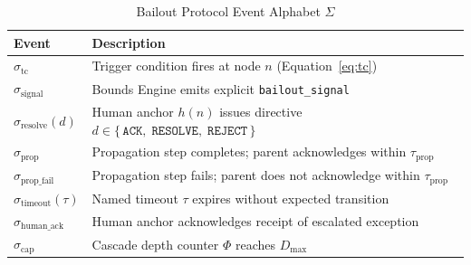 \begin{table}[h]
\caption{Bailout Protocol Event Alphabet $\Sigma$}
\label{tab:bp-events}
\small
\begin{tabular}{lp{7cm}}
\toprule
\textbf{Event} & \textbf{Description} \\
\midrule
$\sigma_{\text{tc}}$        & Trigger condition fires at node $n$ (Equation~\ref{eq:tc}) \\
$\sigma_{\text{signal}}$    & Bounds Engine emits explicit \texttt{bailout\_signal} \\
$\sigma_{\text{resolve}}(d)$ & Human anchor $h(n)$ issues directive $d \in \{\,\texttt{ACK},\; \texttt{RESOLVE},\; \texttt{REJECT}\,\}$ \\
$\sigma_{\text{prop}}$       & Propagation step completes; parent acknowledges within $\tau_{\text{prop}}$ \\
$\sigma_{\text{prop\_fail}}$ & Propagation step fails; parent does not acknowledge within $\tau_{\text{prop}}$ \\
$\sigma_{\text{timeout}}(\tau)$ & Named timeout $\tau$ expires without expected transition \\
$\sigma_{\text{human\_ack}}$  & Human anchor acknowledges receipt of escalated exception \\
$\sigma_{\text{cap}}$        & Cascade depth counter $\Phi$ reaches $D_{\max}$ \\
\bottomrule
\end{tabular}
\end{table}

